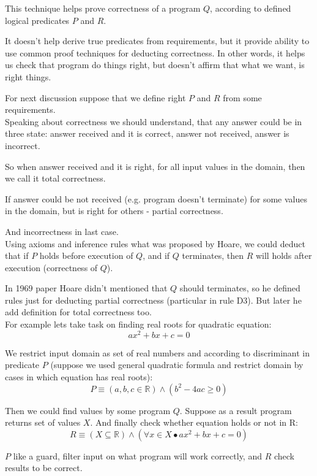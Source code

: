 \documentclass[twoside,twocolumn]{article}
\begin{document}
This technique helps prove correctness of a program $Q$, according to defined
logical predicates $P$ and $R$.

It doesn't help derive true predicates from requirements, but it
provide ability to use common proof techniques for deducting correctness.
In other words, it helps us check that program do things right, but doesn't
affirm that what we want, is right things.

For next discussion suppose that we define right $P$ and $R$ from some
requirements. \\

Speaking about correctness we should understand, that any answer could be in
three state: answer received and it is correct, answer not received, answer is
incorrect. 

So when answer received and it is right, for all input values in the domain,
then we call it total correctness.

If answer could be not received (e.g. program doesn't terminate) for some values
in the domain, but is right for others - partial correctness.

And incorrectness in last case. \\

Using axioms and inference rules what was proposed by Hoare, we could deduct
that if $P$ holds before execution of $Q$, and if $Q$ terminates, then $R$ will
holds after execution (correctness of $Q$).

In 1969 paper Hoare didn't mentioned that $Q$ should terminates, so he defined
rules just for deducting partial correctness (particular in rule D3). But later
he add definition for total correctness too. \\

For example lets take task on finding real roots for quadratic equation:
$$ ax^2 + bx + c = 0$$

We restrict input domain as set of real numbers and according to discriminant in
predicate $P$ (suppose we used general quadratic formula and restrict domain by
cases in which equation has real roots):
$$ P \equiv (a, b, c \in \mathbb{R}) \wedge (b^2 - 4ac \geq 0)$$

Then we could find values by some program $Q$. Suppose as a result program
returns set of values $X$.
And finally check whether equation holds or not in R: 
$$ R \equiv (X \subseteq \mathbb{R}) \wedge (\forall x \in X \bullet ax^2 + bx + c
= 0)$$

$P$ like a guard, filter input on what program will work correctly, and $R$
check results to be correct. 
\end{document}
